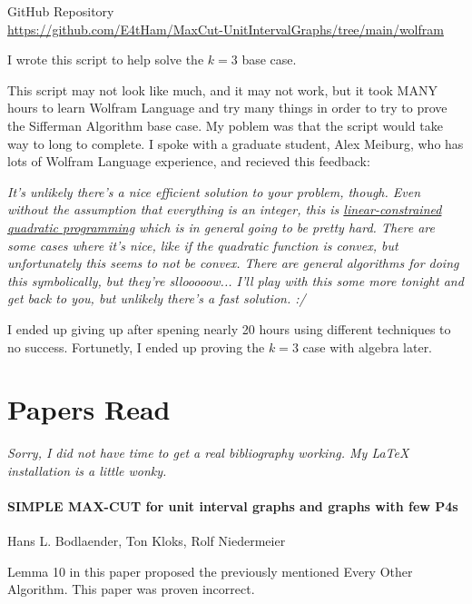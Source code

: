 \documentclass[12pt]{article}
\begin{document}
\begin{center}
    GitHub Repository   \\
    \url{https://github.com/E4tHam/MaxCut-UnitIntervalGraphs/tree/main/wolfram}
\end{center}

I wrote this script to help solve the $k=3$ base case.


This script may not look like much, and it may not work, but it took MANY hours to learn Wolfram Language and try many things in order to try to prove the Sifferman Algorithm base case. My poblem was that the script would take way to long to complete. I spoke with a graduate student, Alex Meiburg, who has lots of Wolfram Language experience, and recieved this feedback:

\emph{
    It's unlikely there's a nice efficient solution to your problem, though. Even without the assumption that everything is an integer, this is \underline{linear-constrained} \\
    \underline{quadratic programming} which is in general going to be pretty hard. There are some cases where it's nice, like if the quadratic function is convex, but unfortunately this seems to not be convex. There are general algorithms for doing this symbolically, but they're sllooooow... I'll play with this some more tonight and get back to you, but unlikely there's a fast solution. :/
}

I ended up giving up after spening nearly 20 hours using different techniques to no success. Fortunetly, I ended up proving the $k=3$ case with algebra later.



\pagebreak



\section{Papers Read}
\emph{Sorry, I did not have time to get a real bibliography working. My LaTeX installation is a little wonky.}


\paragraph{SIMPLE MAX-CUT for unit interval graphs and graphs with few P4s} Hans L. Bodlaender, Ton Kloks, Rolf Niedermeier

Lemma 10 in this paper proposed the previously mentioned Every Other Algorithm. This paper was proven incorrect.
\end{document}
